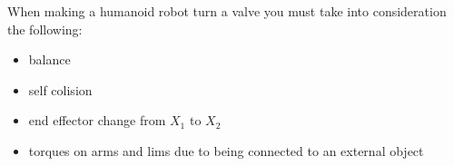 When making a humanoid robot turn a valve you must take into consideration the following:

\begin{itemize}
\item balance
\item self colision
\item end effector change from $X_1$ to $X_2$
\item torques on arms and lims due to being connected to an external object
\end{itemize}
